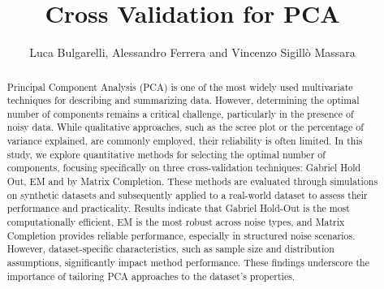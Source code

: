 \documentclass{article}
\begin{document}
\title{Cross Validation for PCA}
\author{Luca Bulgarelli, Alessandro Ferrera and Vincenzo Sigillò Massara}
\date{}

\maketitle

\begin{abstract}
Principal Component Analysis (PCA) is one of the most widely used multivariate techniques for describing and summarizing data. 
However, determining the optimal number of components remains a critical challenge, particularly in the presence of noisy data. 
While qualitative approaches, such as the scree plot or the percentage of variance explained, are commonly employed, their reliability is often limited. 
In this study, we explore quantitative methods for selecting the optimal number of components, focusing specifically on three cross-validation techniques: 
Gabriel Hold Out, EM and by Matrix Completion. 
These methods are evaluated through simulations on synthetic datasets and subsequently applied to a real-world dataset to assess their performance and practicality.
Results indicate that Gabriel Hold-Out is the most computationally efficient, EM is the most robust across noise types, and Matrix Completion provides reliable performance, especially in structured noise scenarios. 
However, dataset-specific characteristics, such as sample size and distribution assumptions, significantly impact method performance. 
These findings underscore the importance of tailoring PCA approaches to the dataset's properties.
\end{abstract}
\end{document}
